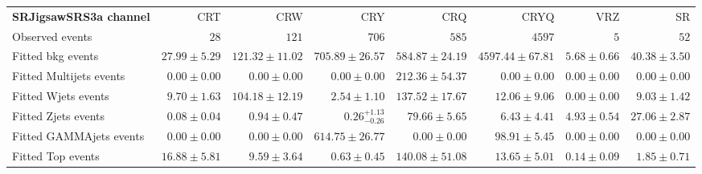 

\begin{table}
\begin{center}
\setlength{\tabcolsep}{0.0pc}
{\tiny
\begin{tabular*}{\textwidth}{@{\extracolsep{\fill}}lrrrrrrr}
\noalign{\smallskip}\hline\noalign{\smallskip}
{\bf SRJigsawSRS3a channel}           & CRT            & CRW            & CRY            & CRQ            & CRYQ            & VRZ            & SR              \\[-0.05cm]
\noalign{\smallskip}\hline\noalign{\smallskip}
Observed events          & $28$              & $121$              & $706$              & $585$              & $4597$              & $5$              & $52$                    \\
\noalign{\smallskip}\hline\noalign{\smallskip}
Fitted bkg events         & $27.99 \pm 5.29$          & $121.32 \pm 11.02$          & $705.89 \pm 26.57$          & $584.87 \pm 24.19$          & $4597.44 \pm 67.81$          & $5.68 \pm 0.66$          & $40.38 \pm 3.50$              \\
\noalign{\smallskip}\hline\noalign{\smallskip}
        Fitted Multijets events         & $0.00 \pm 0.00$          & $0.00 \pm 0.00$          & $0.00 \pm 0.00$          & $212.36 \pm 54.37$          & $0.00 \pm 0.00$          & $0.00 \pm 0.00$          & $0.00 \pm 0.00$              \\
        Fitted Wjets events         & $9.70 \pm 1.63$          & $104.18 \pm 12.19$          & $2.54 \pm 1.10$          & $137.52 \pm 17.67$          & $12.06 \pm 9.06$          & $0.00 \pm 0.00$          & $9.03 \pm 1.42$              \\
        Fitted Zjets events         & $0.08 \pm 0.04$          & $0.94 \pm 0.47$          & $0.26_{-0.26}^{+1.13}$          & $79.66 \pm 5.65$          & $6.43 \pm 4.41$          & $4.93 \pm 0.54$          & $27.06 \pm 2.87$              \\
        Fitted GAMMAjets events         & $0.00 \pm 0.00$          & $0.00 \pm 0.00$          & $614.75 \pm 26.77$          & $0.00 \pm 0.00$          & $98.91 \pm 5.45$          & $0.00 \pm 0.00$          & $0.00 \pm 0.00$              \\
        Fitted Top events         & $16.88 \pm 5.81$          & $9.59 \pm 3.64$          & $0.63 \pm 0.45$          & $140.08 \pm 51.08$          & $13.65 \pm 5.01$          & $0.14 \pm 0.09$          & $1.85 \pm 0.71$              \\

\end{tabular*}}
\end{center}
\end{table}
